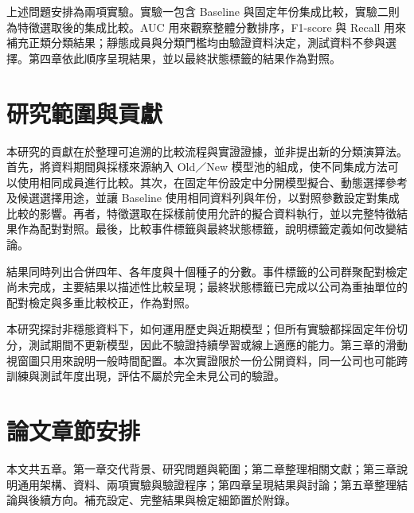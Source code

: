 上述問題安排為兩項實驗。實驗一包含 Baseline 與固定年份集成比較，實驗二則為特徵選取後的集成比較。AUC 用來觀察整體分數排序，F1-score 與 Recall 用來補充正類分類結果；靜態成員與分類門檻均由驗證資料決定，測試資料不參與選擇。第四章依此順序呈現結果，並以最終狀態標籤的結果作為對照。

\section{研究範圍與貢獻}

本研究的貢獻在於整理可追溯的比較流程與實證證據，並非提出新的分類演算法。首先，將資料期間與採樣來源納入 Old／New 模型池的組成，使不同集成方法可以使用相同成員進行比較。其次，在固定年份設定中分開模型擬合、動態選擇參考及候選選擇用途，並讓 Baseline 使用相同資料列與年份，以對照參數設定對集成比較的影響。再者，特徵選取在採樣前使用允許的擬合資料執行，並以完整特徵結果作為配對對照。最後，比較事件標籤與最終狀態標籤，說明標籤定義如何改變結論。

結果同時列出合併四年、各年度與十個種子的分數。事件標籤的公司群聚配對檢定尚未完成，主要結果以描述性比較呈現；最終狀態標籤已完成以公司為重抽單位的配對檢定與多重比較校正，作為對照。

本研究探討非穩態資料下，如何運用歷史與近期模型；但所有實驗都採固定年份切分，測試期間不更新模型，因此不驗證持續學習或線上適應的能力。第三章的滑動視窗圖只用來說明一般時間配置。本次實證限於一份公開資料，同一公司也可能跨訓練與測試年度出現，評估不屬於完全未見公司的驗證。

\section{論文章節安排}

本文共五章。第一章交代背景、研究問題與範圍；第二章整理相關文獻；第三章說明通用架構、資料、兩項實驗與驗證程序；第四章呈現結果與討論；第五章整理結論與後續方向。補充設定、完整結果與檢定細節置於附錄。
\endgroup
